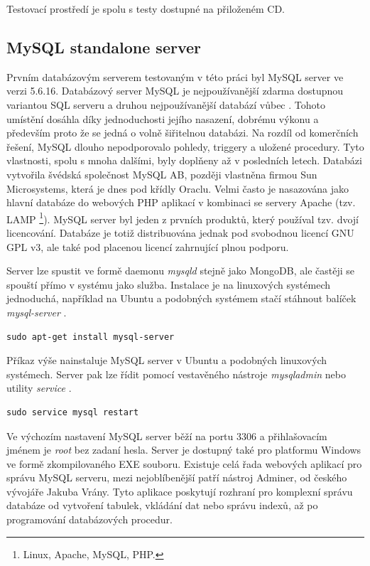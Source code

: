 Testovací prostředí je spolu s testy dostupné na přiloženém CD.

\subsection{MySQL standalone server}
Prvním databázovým serverem testovaným v této práci byl MySQL server ve verzi 5.6.16. 
Databázový server MySQL je nejpoužívanější zdarma dostupnou variantou SQL serveru a druhou nejpoužívanější databází vůbec \cite{enginesRanking}. Tohoto umístění dosáhla díky jednoduchosti jejího nasazení, dobrému výkonu a především proto že se jedná o volně šiřitelnou databázi. Na rozdíl od komerčních řešení, MySQL dlouho nepodporovalo pohledy, triggery a uložené procedury. Tyto vlastnosti, spolu s mnoha dalšími, byly doplňeny až v posledních letech. Databázi vytvořila švédská společnost MySQL AB, později vlastněna firmou Sun Microsystems, která je dnes pod křídly Oraclu. Velmi často je nasazována jako hlavní databáze do webových PHP aplikací v kombinaci se servery Apache (tzv. LAMP \footnote{Linux, Apache, MySQL, PHP.}). MySQL server byl jeden z prvních produktů, který používal tzv. dvojí licencování. Databáze je totiž distribuována jednak pod svobodnou licencí GNU GPL v3, ale také pod placenou licencí zahrnující plnou podporu.

Server lze spustit ve formě daemonu \emph{mysqld} stejně jako MongoDB, ale častěji se spouští přímo v systému jako služba. Instalace je na linuxových systémech jednoduchá, například na Ubuntu a podobných systémem stačí stáhnout balíček \emph{mysql-server} \cite{mysqlUbuntu}. 
\begin{lstlisting}[caption={Instalace MySQL serveru na Ubuntu}]
sudo apt-get install mysql-server
\end{lstlisting} 
Příkaz výše nainstaluje MySQL server v Ubuntu a podobných linuxových systémech. Server pak lze řídit pomocí vestavěného nástroje \emph{mysqladmin} nebo utility \emph{service}  \cite{mysqlUbuntu}.

\vspace{0.5cm}

\begin{lstlisting}[caption={Restart MySQL serveru pomocí utility service}]
sudo service mysql restart
\end{lstlisting}
Ve výchozím nastavení MySQL server běží na portu 3306 a přihlašovacím jménem je \emph{root} bez zadaní hesla. Server je dostupný také pro platformu Windows ve formě zkompilovaného EXE souboru. Existuje celá řada webových aplikací pro správu MySQL serveru, mezi nejoblíbenější patří nástroj Adminer, od českého vývojáře Jakuba Vrány. Tyto aplikace poskytují rozhraní pro komplexní správu databáze od vytvoření tabulek, vkládání dat nebo správu indexů, až po programování databázových procedur.
\pagebreak
